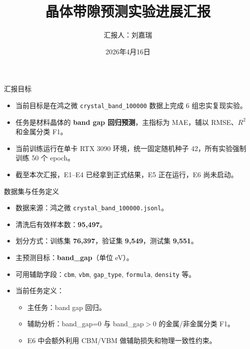\documentclass{beamer}
\title[Matbench GNN 进展汇报]{晶体带隙预测实验进展汇报}
\author[刘嘉瑞]{汇报人：刘嘉瑞}
\institute[Band Gap]{项目：基于晶体图神经网络的 band gap 预测}
\date{2026年4月16日}
\begin{document}
\begin{frame}
 \titlepage
\end{frame}

\begin{frame}{汇报目标}
\begin{itemize}
  \item 当前目标是在鸿之微 \texttt{crystal\_band\_100000} 数据上完成 6 组忠实复现实验。
  \item 任务是材料晶体的 \textbf{band gap 回归预测}，主指标为 MAE，辅以 RMSE、$R^2$ 和金属分类 F1。
  \item 当前训练运行在单卡 RTX 3090 环境，统一固定随机种子 42，所有实验强制训练 50 个 epoch。
  \item 截至本次汇报，E1--E4 已经拿到正式结果，E5 正在运行，E6 尚未启动。
\end{itemize}
\end{frame}

\begin{frame}{数据集与任务定义}
\small
\begin{itemize}
  \item 数据来源：鸿之微 \texttt{crystal\_band\_100000.jsonl}。
  \item 清洗后有效样本数：\textbf{95,497}。
  \item 划分方式：训练集 \textbf{76,397}，验证集 \textbf{9,549}，测试集 \textbf{9,551}。
  \item 主预测目标：\textbf{band\_gap}（单位 eV）。
  \item 可用辅助字段：\texttt{cbm}, \texttt{vbm}, \texttt{gap\_type}, \texttt{formula}, \texttt{density} 等。
  \item 当前任务定义：
  \begin{itemize}
    \item 主任务：band gap 回归。
    \item 辅助分析：band\_gap=0 与 band\_gap$>$0 的金属/非金属分类 F1。
    \item E6 中会额外利用 CBM/VBM 做辅助损失和物理一致性约束。
  \end{itemize}
\end{itemize}
\end{frame}
\end{document}
